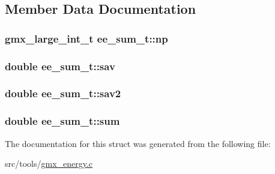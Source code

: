 \subsection{\-Member \-Data \-Documentation}
\hypertarget{structee__sum__t_afc98ac8aa79873c6568d33ab168a11f1}{
\subsubsection[{np}]{\setlength{\rightskip}{0pt plus 5cm}gmx\-\_\-large\-\_\-int\-\_\-t {\bf ee\-\_\-sum\-\_\-t\-::np}}}\label{structee__sum__t_afc98ac8aa79873c6568d33ab168a11f1}
\hypertarget{structee__sum__t_a24ec606cf09127b741dca9739ac78d0d}{
\subsubsection[{sav}]{\setlength{\rightskip}{0pt plus 5cm}double {\bf ee\-\_\-sum\-\_\-t\-::sav}}}\label{structee__sum__t_a24ec606cf09127b741dca9739ac78d0d}
\hypertarget{structee__sum__t_a8ddea3841a5cc291cb160222727d39c9}{
\subsubsection[{sav2}]{\setlength{\rightskip}{0pt plus 5cm}double {\bf ee\-\_\-sum\-\_\-t\-::sav2}}}\label{structee__sum__t_a8ddea3841a5cc291cb160222727d39c9}
\hypertarget{structee__sum__t_a32c4832afef746c7beb768ee0af9da99}{
\subsubsection[{sum}]{\setlength{\rightskip}{0pt plus 5cm}double {\bf ee\-\_\-sum\-\_\-t\-::sum}}}\label{structee__sum__t_a32c4832afef746c7beb768ee0af9da99}


\-The documentation for this struct was generated from the following file\-:\begin{DoxyCompactItemize}
\item 
src/tools/\hyperlink{gmx__energy_8c}{gmx\-\_\-energy.\-c}\end{DoxyCompactItemize}

